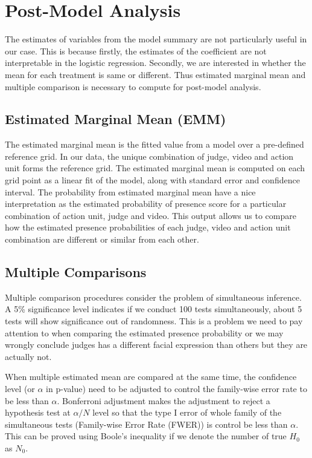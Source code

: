\documentclass{monashthesis}
\begin{document}
\newpage

\hypertarget{post-model-analysis}{%
\section{Post-Model Analysis}\label{post-model-analysis}}

The estimates of variables from the model summary are not particularly useful in our case. This is because firstly, the estimates of the coefficient are not interpretable in the logistic regression. Secondly, we are interested in whether the mean for each treatment is same or different. Thus estimated marginal mean and multiple comparison is necessary to compute for post-model analysis.

\hypertarget{estimated-marginal-mean-emm}{%
\subsection{Estimated Marginal Mean (EMM)}\label{estimated-marginal-mean-emm}}

The estimated marginal mean \autocite{gelman2006data} is the fitted value from a model over a pre-defined reference grid. In our data, the unique combination of judge, video and action unit forms the reference grid. The estimated marginal mean is computed on each grid point as a linear fit of the model, along with standard error and confidence interval. The probability from estimated marginal mean have a nice interpretation as the estimated probability of presence score for a particular combination of action unit, judge and video. This output allows us to compare how the estimated presence probabilities of each judge, video and action unit combination are different or similar from each other.

\hypertarget{multiple-comparisons}{%
\subsection{Multiple Comparisons}\label{multiple-comparisons}}

Multiple comparison procedures consider the problem of simultaneous inference. A 5\% significance level indicates if we conduct 100 tests simultaneously, about 5 tests will show significance out of randomness. This is a problem we need to pay attention to when comparing the estimated presence probability or we may wrongly conclude judges has a different facial expression than others but they are actually not.

When multiple estimated mean are compared at the same time, the confidence level (or \(\alpha\) in p-value) need to be adjusted to control the family-wise error rate to be less than \(\alpha\). Bonferroni adjustment makes the adjustment to reject a hypothesis test at \(\alpha/N\) level so that the type I error of whole family of the simultaneous tests (Family-wise Error Rate (FWER)) is control be less than \(\alpha\). This can be proved using Boole's inequality if we denote the number of true \(H_0\) as \(N_0\).
\end{document}
